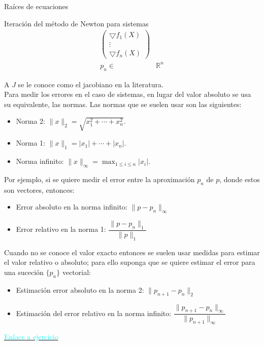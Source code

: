 \begin{frame}{Raíces de ecuaciones}
\begin{block}{Iteración del método de Newton para sistemas}
\begin{align*}
\begin{pmatrix}
\bigtriangledown f_1(X)\\
\vdots\\
\bigtriangledown f_n(X)
\end{pmatrix}\\
p_{n}\in &\mathbb{R}^n
\end{align*}
\end{block}
\indent A $J$ se le conoce como el jacobiano en la literatura.\\
\indent Para medir los errores en el caso de sistemas, en lugar del valor absoluto se usa su equivalente, las normas. Las normas que se suelen usar son las siguientes:
\begin{itemize}
\item Norma 2: $\parallel x\parallel_2=\sqrt{x_1^2+\cdots +x_n^2}$.
\item Norma 1: $\parallel x\parallel_1=|x_1|+\cdots +|x_n|$.
\item Norma infinito: $\displaystyle \parallel x\parallel_\infty=\max_{1\leq i\leq n}|x_i|$.
\end{itemize}
\indent Por ejemplo, si se quiere medir el error entre la aproximación $p_n$ de $p$, donde estos son vectores, entonces:
\begin{itemize}
\item Error absoluto en la norma infinito: $\displaystyle \parallel p-p_n\parallel_\infty$
\item Error relativo en la norma 1: $\displaystyle \dfrac{\parallel p-p_n\parallel_1}{\parallel p \parallel_1}$
\end{itemize}
\indent Cuando no se conoce el valor exacto entonces se suelen usar medidas para estimar el valor relativo o absoluto; para ello suponga que se quiere estimar el error para una suceción $\{p_n\}$ vectorial:
\begin{itemize}
\item Estimación error absoluto en la norma 2: $\displaystyle \parallel p_{n+1}-p_n\parallel_2$
\item Estimación del error relativo en la norma infinito: $\displaystyle \dfrac{\parallel p_{n+1}-p_n\parallel_\infty}{\parallel p_{n+1} \parallel_\infty}$
\end{itemize}
\hyperlink{EjercicioNewtonSistemas}{\textcolor{cyan}{Enlace a ejercicio}}
\end{frame}
